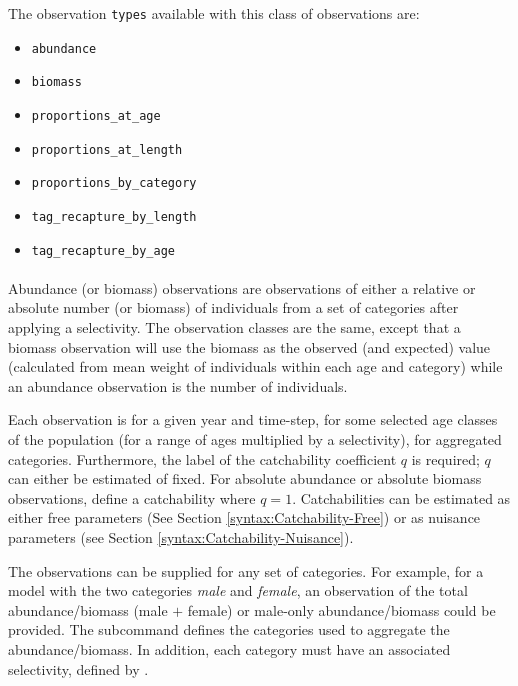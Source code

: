 The observation \texttt{types} available with this class of observations are:

\begin{itemize}
	\item \texttt{abundance}
	\item \texttt{biomass}
	\item \texttt{proportions\_at\_age}
	\item \texttt{proportions\_at\_length}
	\item \texttt{proportions\_by\_category}
	\item \texttt{tag\_recapture\_by\_length}
	\item \texttt{tag\_recapture\_by\_age}
\end{itemize}

\paragraph*{}\label{sec:Observation-Abundance}\label{sec:Observation-Biomass}

Abundance (or biomass) observations are observations of either a relative or absolute number (or biomass) of individuals from a set of categories after applying a selectivity. The observation classes are the same, except that a biomass observation will use the biomass as the observed (and expected) value (calculated from mean weight of individuals within each age and category) while an abundance observation is the number of individuals.

Each observation is for a given year and time-step, for some selected age classes of the population (for a range of ages multiplied by a selectivity), for aggregated categories. Furthermore, the label of the catchability coefficient $q$ is required;  $q$ can either be estimated of fixed. For absolute abundance or absolute biomass observations, define a catchability where $q=1$. Catchabilities can be estimated as either free parameters (See Section \ref{syntax:Catchability-Free}) or as nuisance parameters (see Section \ref{syntax:Catchability-Nuisance}). 

The observations can be supplied for any set of categories. For example, for a model with the two categories \emph{male} and \emph{female}, an observation of the total abundance/biomass (male $+$ female) or male-only abundance/biomass could be provided. The subcommand  defines the categories used to aggregate the abundance/biomass. In addition, each category must have an associated selectivity, defined by .

